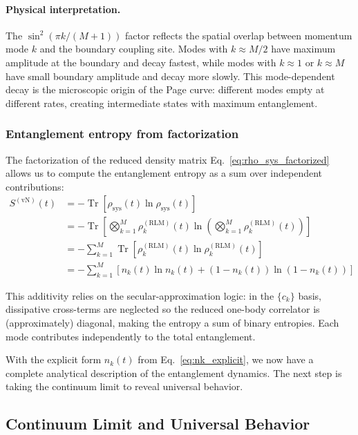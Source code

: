 \documentclass[12pt,oneside,openright]{report}
\theoremstyle{definition}
\theoremstyle{plain}
\theoremstyle{remark}
\begin{document}
\paragraph{Physical interpretation.}
The $\sin^2(\pi k/(M+1))$ factor reflects the spatial overlap between momentum mode $k$ and the boundary coupling site. Modes with $k \approx M/2$ have maximum amplitude at the boundary and decay fastest, while modes with $k \approx 1$ or $k \approx M$ have small boundary amplitude and decay more slowly. This mode-dependent decay is the microscopic origin of the Page curve: different modes empty at different rates, creating intermediate states with maximum entanglement.

\subsubsection{Entanglement entropy from factorization}

The factorization of the reduced density matrix Eq.~\eqref{eq:rho_sys_factorized} allows us to compute the entanglement entropy as a sum over independent contributions:
\begin{align}
S^{(\text{vN})}(t) &= -\operatorname{Tr}[\rho_{\text{sys}}(t) \ln \rho_{\text{sys}}(t)]\\
&= -\operatorname{Tr}\left[\bigotimes_{k=1}^M \rho_k^{(\text{RLM})}(t) \ln \left(\bigotimes_{k=1}^M \rho_k^{(\text{RLM})}(t)\right)\right]\\
&= -\sum_{k=1}^M \operatorname{Tr}[\rho_k^{(\text{RLM})}(t) \ln \rho_k^{(\text{RLM})}(t)]\\
&= -\sum_{k=1}^M \left[n_k(t) \ln n_k(t) + (1-n_k(t)) \ln(1-n_k(t))\right]
\end{align}

This additivity relies on the secular-approximation logic: in the $\{c_k\}$ basis, dissipative cross-terms are neglected so the reduced one-body correlator is (approximately) diagonal, making the entropy a sum of binary entropies. Each mode contributes independently to the total entanglement.

With the explicit form $n_k(t)$ from Eq.~\eqref{eq:nk_explicit}, we now have a complete analytical description of the entanglement dynamics. The next step is taking the continuum limit to reveal universal behavior.

\subsection{Continuum Limit and Universal Behavior}
\label{subsec:universal_behavior}
\end{document}
